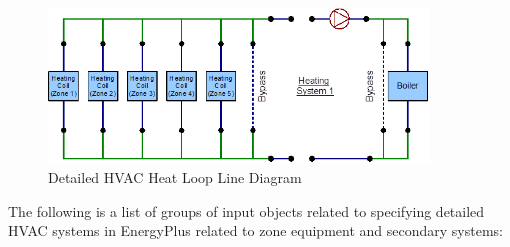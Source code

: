 \begin{figure}[hbtp]
\centering
\includegraphics[width=0.9\textwidth, height=0.9\textheight, keepaspectratio=true]{media/HvacHeatLoop.png}
\caption{Detailed HVAC Heat Loop Line Diagram}
\end{figure}

The following is a list of groups of input objects related to specifying
detailed HVAC systems in EnergyPlus related to zone equipment and
secondary systems:
